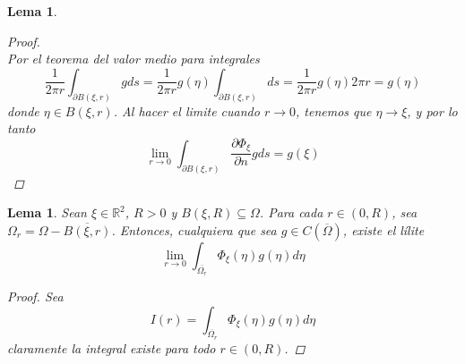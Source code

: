 \documentclass[11pt]{book}
\theoremstyle{plain}
\newtheorem{lema}[proposición]{Lema}
\theoremstyle{definition}
\newcommand{\R}{\mathbb{R}}
\begin{document}
\begin{lema}
\begin{proof}
\[            \]
            Por el teorema del valor medio para integrales
            \[
                \frac{1}{2\pi r} \int_{\partial B(\xi,r)} g ds = \frac{1}{2\pi r} g(\eta) \int_{\partial B(\xi,r)} ds = \frac{1}{2\pi r} g(\eta) 2\pi r = g(\eta)
            \]
            donde $\eta \in B(\xi,r)$. Al hacer el limite cuando $r \to 0$, tenemos que $\eta \to \xi$, y por lo tanto
            \[
                \lim_{r \to 0} \int_{\partial B(\xi,r)} \frac{\partial \Phi_{\xi}}{\partial n}g ds = g(\xi)
            \]
        \end{proof}
    \end{lema}

    \begin{lema}
        Sean $\xi \in \R^{2}$, $R > 0$ y $B(\xi,R) \subseteq \Omega$. Para cada $r \in (0,R)$, sea $\Omega_{r} = \Omega - \overline{B(\xi,r)}$. Entonces, cualquiera que sea $g \in C(\overline{\Omega})$, existe el lílite
        \[
            \lim_{r \to 0} \int_{\overline{\Omega_{r}}} \Phi_{\xi}(\eta)g(\eta) d\eta
        \]
        \begin{proof}
            Sea
            \[
                I(r) = \int_{\overline{\Omega_{r}}} \Phi_{\xi}(\eta)g(\eta) d\eta  
            \]
            claramente la integral existe para todo $r \in (0,R)$.


\end{proof}
\end{lema}
\end{document}
